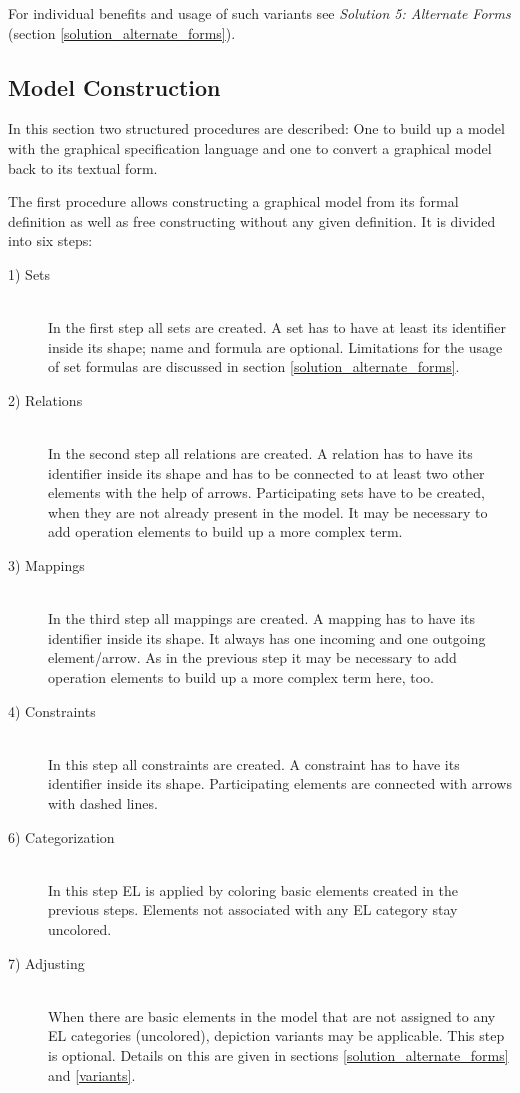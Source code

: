 \documentclass[twoside, openright, 12pt]{book}
\begin{document}
For individual benefits and usage of such variants see \textit{Solution 5: Alternate Forms} (section \ref{solution_alternate_forms}).



\subsection{Model Construction}
\label{gsl_construction}
In this section two structured procedures are described: One to build up a model with the graphical specification language and one to convert a graphical model back to its textual form.

The first procedure allows constructing a graphical model from its formal definition as well as free constructing without any given definition.
It is divided into six steps:

\begin{description}
\item[1) Sets]\hfill \\
In the first step all sets are created.
A set has to have at least its identifier inside its shape; name and formula are optional.
Limitations for the usage of set formulas are discussed in section \ref{solution_alternate_forms}.

\item[2) Relations]\hfill \\
In the second step all relations are created.
A relation has to have its identifier inside its shape and has to be connected to at least two other elements with the help of arrows.
Participating sets have to be created, when they are not already present in the model.
It may be necessary to add operation elements to build up a more complex term.

\item[3) Mappings]\hfill \\
In the third step all mappings are created.
A mapping has to have its identifier inside its shape.
It always has one incoming and one outgoing element/arrow.
As in the previous step it may be necessary to add operation elements to build up a more complex term here, too.

\item[4) Constraints]\hfill \\
In this step all constraints are created.
A constraint has to have its identifier inside its shape.
Participating elements are connected with arrows with dashed lines.

\item[6) Categorization]\hfill \\
In this step EL is applied by coloring basic elements created in the previous steps.
Elements not associated with any EL category stay uncolored.

\item[7) Adjusting]\hfill \\
When there are basic elements in the model that are not assigned to any EL categories (uncolored), depiction variants may be applicable.
This step is optional.
Details on this are given in sections \ref{solution_alternate_forms} and \ref{variants}.
\end{description}
\end{document}
